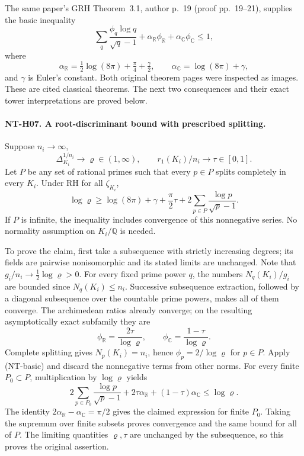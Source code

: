 The same paper's GRH Theorem~3.1, author p.~19 (proof pp.~19--21),
supplies the basic inequality
\[
 \sum_q\frac{\phi_q\log q}{\sqrt q-1}
 +\alpha_{\mathbb R}\phi_{\mathbb R}
 +\alpha_{\mathbb C}\phi_{\mathbb C}\le1,
\tag{NT-basic}
\]
where
\[
 \alpha_{\mathbb R}=\tfrac12\log(8\pi)+\tfrac\pi4+\tfrac\gamma2,
 \qquad
 \alpha_{\mathbb C}=\log(8\pi)+\gamma,
\]
and $\gamma$ is Euler's constant.  Both original theorem pages were
inspected as images.  These are cited classical theorems.  The next
two consequences and their exact tower interpretations are proved below.

\paragraph{NT-H07. A root-discriminant bound with prescribed splitting.}
Suppose $n_i\to\infty$,
\[
 \Delta_{K_i}^{1/n_i}\longrightarrow\varrho\in(1,\infty),
 \qquad r_1(K_i)/n_i\longrightarrow\tau\in[0,1].
\]
Let $P$ be any set of rational primes such that every $p\in P$ splits
completely in every $K_i$.  Under RH for all $\zeta_{K_i}$,
\[
 \log\varrho\ge\log(8\pi)+\gamma+\frac\pi2\tau
          +2\sum_{p\in P}\frac{\log p}{\sqrt p-1}.
\tag{NT-H07}
\]
If $P$ is infinite, the inequality includes convergence of this
nonnegative series.  No normality assumption on $K_i/\mathbb Q$ is
needed.

To prove the claim, first take a subsequence with strictly increasing
degrees; its fields are pairwise nonisomorphic and its stated limits
are unchanged.  Note that
$g_i/n_i\to\tfrac12\log\varrho>0$.
For every fixed prime power $q$, the numbers $N_q(K_i)/g_i$ are
bounded since $N_q(K_i)\le n_i$.  Successive subsequence extraction,
followed by a diagonal subsequence over the countable prime powers,
makes all of them converge.  The archimedean ratios already converge;
on the resulting asymptotically exact subfamily they are
\[
 \phi_{\mathbb R}=\frac{2\tau}{\log\varrho},\qquad
 \phi_{\mathbb C}=\frac{1-\tau}{\log\varrho}.
\]
Complete splitting gives $N_p(K_i)=n_i$, hence
$\phi_p=2/\log\varrho$ for $p\in P$.
Apply (NT-basic) and discard the nonnegative terms from other norms.
For every finite $P_0\subset P$, multiplication by $\log\varrho$
yields
\[
 2\sum_{p\in P_0}\frac{\log p}{\sqrt p-1}
 +2\tau\alpha_{\mathbb R}+(1-\tau)\alpha_{\mathbb C}
 \le\log\varrho.
\]
The identity
$2\alpha_{\mathbb R}-\alpha_{\mathbb C}=\pi/2$
gives the claimed expression for finite $P_0$.  Taking the supremum
over finite subsets proves convergence and the same bound for all of
$P$.  The limiting quantities $\varrho,\tau$ are unchanged by the
subsequence, so this proves the original assertion.

